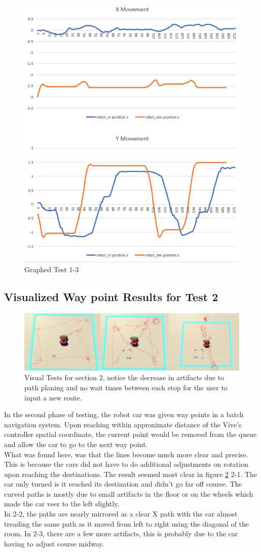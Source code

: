 \documentclass[10pt,a4paper]{article}
\begin{document}
	\begin{figure}
		\centering
		\includegraphics[width=.4\textwidth]{Test1_charts/t1_3_x_z.png}
		\caption{Graphed Test 1-3}
		\label{fig:graph_comp_t1_3}
	\end{figure}


	\subsection*{Visualized Way point Results for Test 2}
	\begin{figure}
		\centering
		\includegraphics[width=1\textwidth]{Test2_visuals/Test2_mosaic.png}
		\caption{Visual Tests for section 2, notice the decrease in artifacts due to path planing and no wait times between each stop for the user to input a new route.}
		\label{fig:vis_comp_t2}
	\end{figure}
	In the second phase of testing, the robot car was given way points in a batch navigation system. Upon reaching within approximate distance of the Vive's controller spatial coordinate, the current point would be removed from the queue and allow the car to go to the next way point.
	\\
	What was found here, was that the lines become much more clear and precise. This is because the cars did not have to do additional adjustments on rotation upon reaching the destinations. The result seemed most clear in figure \ref{fig:vis_comp_t2} 2-1. The car only turned is it reached its destination and didn't go far off course. The curved paths is mostly due to small artifacts in the floor or on the wheels which made the car veer to the left slightly.
	\\
	In 2-2, the paths are nearly mirrored as a clear X path with the car almost treading the same path as it moved from left to right using the diagonal of the room. In 2-3, there are a few more artifacts, this is probably due to the car having to adjust course midway.
\end{document}

